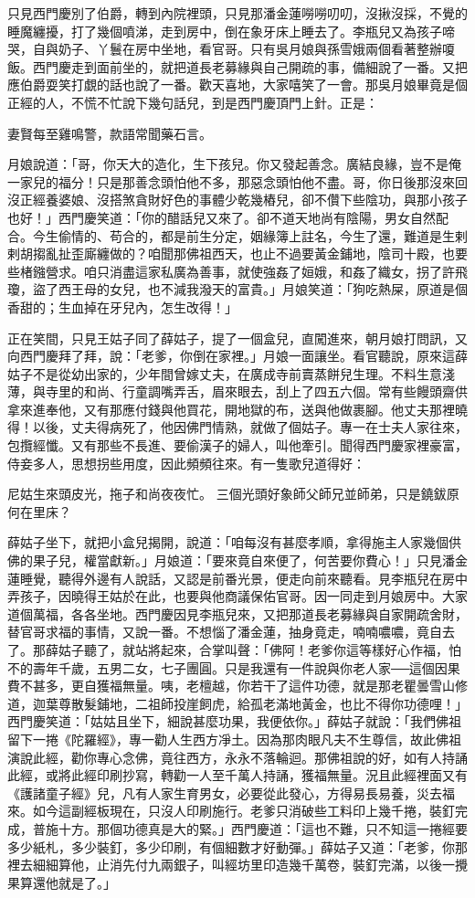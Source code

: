 只見西門慶別了伯爵，轉到內院裡頭，只見那潘金蓮嘮嘮叨叨，沒揪沒採，不覺的睡魔纏擾，打了幾個噴涕，走到房中，倒在象牙床上睡去了。李瓶兒又為孩子啼哭，自與奶子、丫鬟在房中坐地，看官哥。只有吳月娘與孫雪娥兩個看著整辦嗄飯。西門慶走到面前坐的，就把道長老募緣與自己開疏的事，備細說了一番。又把應伯爵耍笑打覷的話也說了一番。歡天喜地，大家嘻笑了一會。那吳月娘畢竟是個正經的人，不慌不忙說下幾句話兒，到是西門慶頂門上針。正是：

妻賢每至雞鳴警，款語常聞藥石言。

月娘說道：「哥，你天大的造化，生下孩兒。你又發起善念。廣結良緣，豈不是俺一家兒的福分！只是那善念頭怕他不多，那惡念頭怕他不盡。哥，你日後那沒來回沒正經養婆娘、沒搭煞貪財好色的事體少乾幾樁兒，卻不儹下些陰功，與那小孩子也好！」西門慶笑道：「你的醋話兒又來了。卻不道天地尚有陰陽，男女自然配合。今生偷情的、苟合的，都是前生分定，姻緣簿上註名，今生了還，難道是生剌剌胡搊亂扯歪廝纏做的？咱聞那佛祖西天，也止不過要黃金鋪地，陰司十殿，也要些楮鏹營求。咱只消盡這家私廣為善事，就使強姦了姮娥，和姦了織女，拐了許飛瓊，盜了西王母的女兒，也不減我潑天的富貴。」月娘笑道：「狗吃熱屎，原道是個香甜的；生血掉在牙兒內，怎生改得！」

正在笑間，只見王姑子同了薛姑子，提了一個盒兒，直闖進來，朝月娘打問訊，又向西門慶拜了拜，說：「老爹，你倒在家裡。」月娘一面讓坐。看官聽說，原來這薛姑子不是從幼出家的，少年間曾嫁丈夫，在廣成寺前賣蒸餅兒生理。不料生意淺薄，與寺里的和尚、行童調嘴弄舌，眉來眼去，刮上了四五六個。常有些饅頭齋供拿來進奉他，又有那應付錢與他買花，開地獄的布，送與他做裹腳。他丈夫那裡曉得！以後，丈夫得病死了，他因佛門情熟，就做了個姑子。專一在士夫人家往來，包攬經懺。又有那些不長進、要偷漢子的婦人，叫他牽引。聞得西門慶家裡豪富，侍妾多人，思想拐些用度，因此頻頻往來。有一隻歌兒道得好：

尼姑生來頭皮光，拖子和尚夜夜忙。 三個光頭好象師父師兄並師弟，只是鐃鈸原何在里床？

薛姑子坐下，就把小盒兒揭開，說道：「咱每沒有甚麼孝順，拿得施主人家幾個供佛的果子兒，權當獻新。」月娘道：「要來竟自來便了，何苦要你費心！」只見潘金蓮睡覺，聽得外邊有人說話，又認是前番光景，便走向前來聽看。見李瓶兒在房中弄孩子，因曉得王姑於在此，也要與他商議保佑官哥。因一同走到月娘房中。大家道個萬福，各各坐地。西門慶因見李瓶兒來，又把那道長老募緣與自家開疏舍財，替官哥求福的事情，又說一番。不想惱了潘金蓮，抽身竟走，喃喃噥噥，竟自去了。那薛姑子聽了，就站將起來，合掌叫聲：「佛阿！老爹你這等樣好心作福，怕不的壽年千歲，五男二女，七子團圓。只是我還有一件說與你老人家──這個因果費不甚多，更自獲福無量。咦，老檀越，你若干了這件功德，就是那老瞿曇雪山修道，迦葉尊散髮鋪地，二祖師投崖飼虎，給孤老滿地黃金，也比不得你功德哩！」 西門慶笑道：「姑姑且坐下，細說甚麼功果，我便依你。」薛姑子就說：「我們佛祖留下一捲《陀羅經》，專一勸人生西方凈土。因為那肉眼凡夫不生尊信，故此佛祖演說此經，勸你專心念佛，竟往西方，永永不落輪迴。那佛祖說的好，如有人持誦此經，或將此經印刷抄寫，轉勸一人至千萬人持誦，獲福無量。況且此經裡面又有《護諸童子經》兒，凡有人家生育男女，必要從此發心，方得易長易養，災去福來。如今這副經板現在，只沒人印刷施行。老爹只消破些工料印上幾千捲，裝釘完成，普施十方。那個功德真是大的緊。」西門慶道：「這也不難，只不知這一捲經要多少紙札，多少裝釘，多少印刷，有個細數才好動彈。」薛姑子又道：「老爹，你那裡去細細算他，止消先付九兩銀子，叫經坊里印造幾千萬卷，裝釘完滿，以後一攪果算還他就是了。」

